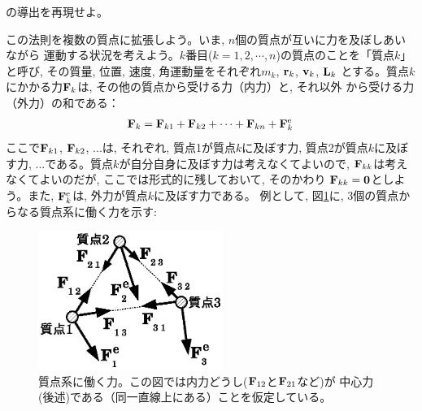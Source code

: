 \begin{q}\label{q:derive_1_angmom} の導出を再現せよ。\end{q}

この法則を複数の質点に拡張しよう。いま, $n$個の質点が互いに力を及ぼしあいながら
運動する状況を考えよう。$k$番目($k=1, 2, \cdots, n$)の質点のことを「質点$k$」と呼び, 
その質量, 位置, 速度, 角運動量をそれぞれ$m_k$, ${\bf r}_k$, ${\bf v}_k$, ${\bf L}_k$
とする。質点$k$にかかる力${\bf F}_k$は, その他の質点から受ける力（内力）と, それ以外
から受ける力（外力）の和である：
\begin{eqnarray} 
{\bf F}_k={\bf F}_{k1}+{\bf F}_{k2}+\cdots+{\bf F}_{kn}+{\bf F}_{k}^{\text{e}}\label{eq:multiforce}
\end{eqnarray} 
ここで${\bf F}_{k1}$, ${\bf F}_{k2}$, ...は, それぞれ, 質点1が質点$k$に及ぼす力, 
質点2が質点$k$に及ぼす力, ...である。質点$k$が自分自身に及ぼす力は考えなくてよいので, 
${\bf F}_{kk}$は考えなくてよいのだが, ここでは形式的に残しておいて, そのかわり
${\bf F}_{kk}={\bf 0}$としよう。また, ${\bf F}_{k}^{\text{e}}$は, 外力が質点$k$に及ぼす力である。
例として, 図\ref{fig:angular_mom_sys}に, 3個の質点からなる質点系に働く力を示す:

\begin{figure}[h]
    \centering
    \includegraphics[width=6.0cm]{angular_mom_sys.eps}
    \caption{質点系に働く力。この図では内力どうし(${\bf F}_{12}$と${\bf F}_{21}$など)が
中心力(後述)である（同一直線上にある）ことを仮定している。}\label{fig:angular_mom_sys}
\end{figure}


